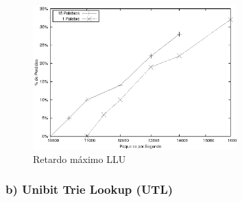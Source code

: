\begin{figure}[!h]
  \centering
	\includegraphics[width=0.7\textwidth]{5-resultados/graf/llumax.eps}
  \caption{Retardo máximo LLU}
  \label{figmaxllu}
\end{figure}



\newpage
\subsubsection{b) Unibit Trie Lookup (UTL) }

